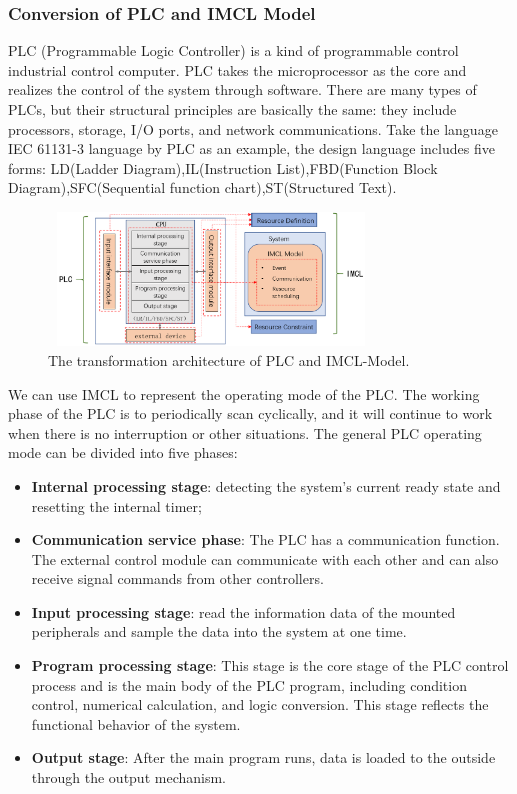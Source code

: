 \subsubsection{\textbf{Conversion of PLC and IMCL Model}}
PLC (Programmable Logic Controller) is a kind of programmable control industrial control computer. PLC takes the microprocessor as the core and realizes the control of the system through software. There are many types of PLCs, but their structural principles are basically the same: they include processors, storage, I/O ports, and network communications. Take the language IEC 61131-3 language by PLC as an example, the design language includes five forms: LD(Ladder Diagram),IL(Instruction List),FBD(Function Block Diagram),SFC(Sequential function chart),ST(Structured Text).

\begin{figure}[!htb]
  \centering
        \includegraphics[height=1.4in, width=3.4in]{PLC2IMCL}
  \caption{The transformation architecture of PLC and IMCL-Model.}\label{PLC2IMCL}
\end{figure}

We can use IMCL to represent the operating mode of the PLC. The working phase of the PLC is to periodically scan cyclically, and it will continue to work when there is no interruption or other situations. The general PLC operating mode can be divided into five phases:

\begin{itemize}
  \item \textbf{Internal processing stage}: detecting the system's current ready state and resetting the internal timer;
  \item \textbf{Communication service phase}: The PLC has a communication function. The external control module can communicate with each other and can also receive signal commands from other controllers.
  \item \textbf{Input processing stage}: read the information data of the mounted peripherals and sample the data into the system at one time.
  \item \textbf{Program processing stage}: This stage is the core stage of the PLC control process and is the main body of the PLC program, including condition control, numerical calculation, and logic conversion. This stage reflects the functional behavior of the system.
  \item \textbf{Output stage}: After the main program runs, data is loaded to the outside through the output mechanism.
\end{itemize}


